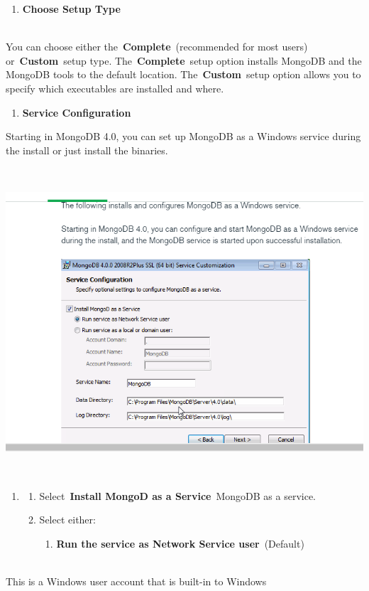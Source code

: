 \documentclass{article}
\begin{document}
\begin{enumerate}
\item  \textbf{Choose Setup Type}
\end{enumerate}

\noindent \\ You can choose either the~\textbf{Complete}~(recommended for most users) or~\textbf{Custom}~setup type. The~\textbf{Complete}~setup option installs MongoDB and the MongoDB tools to the default location. The~\textbf{Custom}~setup option allows you to specify which executables are installed and where.

\begin{enumerate}
\item \textbf{Service Configuration}
\end{enumerate}

\noindent  Starting in MongoDB 4.0, you can set up MongoDB as a Windows service during the install or just install the binaries.

\noindent 

\begin{center}
	\noindent \includegraphics*[width=6.25in, height=4.52in]{IMG-04-01}
\end{center}

\noindent 

\noindent 

\begin{enumerate}
\item \begin{enumerate}
\item  Select~\textbf{Install MongoD as a Service}~MongoDB as a service.

\item  Select either:

\begin{enumerate}
\item   \textbf{Run the service as Network Service user}~(Default)
\end{enumerate}
\end{enumerate}
\end{enumerate}
\newpage
\noindent \\ This is a Windows user account that is built-in to Windows
\end{document}
